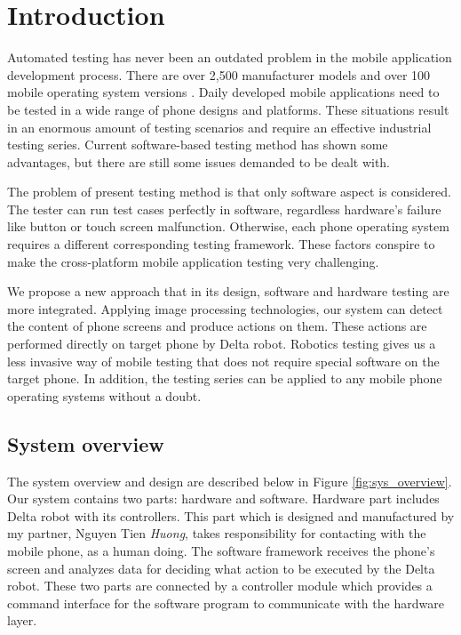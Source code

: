 \chapter{Introduction}

Automated testing has never been an outdated problem in the mobile application development process. There are over 2,500 manufacturer models and over 100 mobile operating system versions \cite{crittercism}. Daily developed mobile applications need to be tested in a wide range of phone designs and platforms. These situations result in an enormous amount of testing scenarios and require an effective industrial testing series. Current software-based testing method has shown some advantages, but there are still some issues demanded to be dealt with.

The problem of present testing method is that only software aspect is considered. The tester can run test cases perfectly in software, regardless hardware's failure like button or touch screen malfunction. Otherwise, each phone operating system requires a different corresponding testing framework. These factors conspire to make the cross-platform mobile application testing very challenging. \nocite{weinman_thesis}

We propose a new approach that in its design, software and hardware testing are more integrated. Applying image processing technologies, our system can detect the content of phone screens and produce actions on them. These actions are performed directly on target phone by Delta robot. Robotics testing gives us a less invasive way of mobile testing that does not require special software on the target phone. In addition, the testing series can be applied to any mobile phone operating systems without a doubt.

\section{System overview}
The system overview and design are described below in Figure \ref{fig:sys_overview}.
Our system contains two parts: hardware and software.
Hardware part includes Delta robot with its controllers. This part which is designed and manufactured by my partner, Nguyen Tien \textit{Huong}, takes responsibility for contacting with the mobile phone, as a human doing.
The software framework receives the phone's screen and analyzes data for deciding what action to be executed by the Delta robot.
These two parts are connected by a controller module which provides a command interface for the software program to communicate with the hardware layer.

